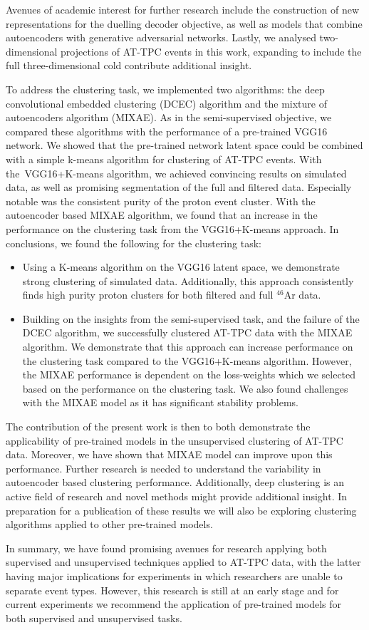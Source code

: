 Avenues of academic interest for further research include the construction of new representations for the duelling decoder objective, as well as models that combine autoencoders with generative adversarial networks.  Lastly, we analysed two-dimensional projections of AT-TPC events in this work, expanding to include the full three-dimensional cold contribute additional insight.

To address the clustering task, we implemented two algorithms: the deep convolutional embedded clustering (DCEC) algorithm and the mixture of autoencoders algorithm (MIXAE). As in the semi-supervised objective, we compared these algorithms with the performance of a pre-trained VGG16 network. We showed that the pre-trained network latent space could be combined with a simple k-means algorithm for clustering of AT-TPC events. With the VGG16+K-means algorithm, we achieved convincing results on simulated data, as well as promising segmentation of the full and filtered data. Especially notable was the consistent purity of the proton event cluster. With the autoencoder based MIXAE  algorithm, we found that an increase in the performance on the clustering task from the VGG16+K-means approach.  In conclusions, we found the following for the clustering task:

\begin{itemize}
\item Using a K-means algorithm on the VGG16 latent space, we demonstrate strong clustering of simulated data. Additionally, this approach consistently finds high purity proton clusters for both filtered and full ${}^{46}$Ar data.
\item Building on the insights from the semi-supervised task, and the failure of the DCEC algorithm,  we successfully clustered AT-TPC data with the MIXAE algorithm. We demonstrate that this approach can increase performance on the clustering task compared to the VGG16+K-means algorithm.  However, the MIXAE performance is dependent on the loss-weights which we selected based on the performance on the clustering task. We also found challenges with the MIXAE model as it has significant stability problems. 
\end{itemize}

The contribution of the present work is then to both demonstrate the applicability of pre-trained models in the unsupervised clustering of AT-TPC data. Moreover, we have shown that MIXAE model can improve upon this performance. Further research is needed to understand the variability in autoencoder based clustering performance. Additionally, deep clustering is an active field of research and novel methods might provide additional insight. In preparation for a publication of these results we will also be exploring clustering algorithms applied to other pre-trained models.

In summary, we have found promising avenues for research applying both supervised and unsupervised techniques applied to AT-TPC data, with the latter having major implications for experiments in which researchers are unable to separate event types. However, this research is still at an early stage and for current experiments we recommend the application of pre-trained models for both supervised and unsupervised tasks.